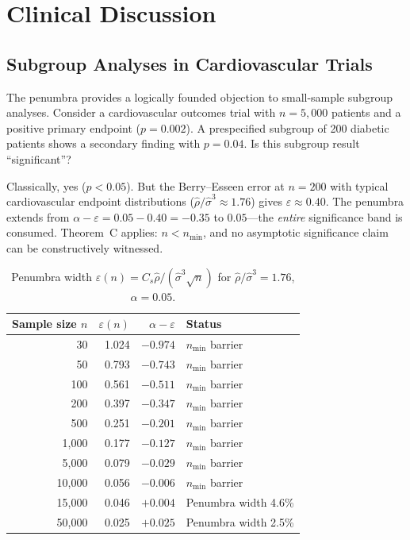 \documentclass[11pt,a4paper]{article}
\theoremstyle{plain}
\theoremstyle{definition}
\begin{document}
\section{Clinical Discussion}\label{sec:clinical}

\subsection{Subgroup Analyses in Cardiovascular Trials}

The penumbra provides a logically founded objection to small-sample subgroup analyses.  Consider a cardiovascular outcomes trial with $n = 5{,}000$ patients and a positive primary endpoint ($p = 0.002$).  A prespecified subgroup of 200 diabetic patients shows a secondary finding with $p = 0.04$.  Is this subgroup result ``significant''?

Classically, yes ($p < 0.05$).  But the Berry--Esseen error at $n = 200$ with typical cardiovascular endpoint distributions ($\hat\rho/\hat\sigma^3 \approx 1.76$) gives $\varepsilon \approx 0.40$.  The penumbra extends from $\alpha - \varepsilon = 0.05 - 0.40 = -0.35$ to $0.05$---the \emph{entire} significance band is consumed.  Theorem~C applies: $n < n_{\min}$, and no asymptotic significance claim can be constructively witnessed.

\begin{table}[ht]
\centering
\caption{Penumbra width $\varepsilon(n) = C_s \hat\rho / (\hat\sigma^3 \sqrt{n})$ for $\hat\rho/\hat\sigma^3 = 1.76$, $\alpha = 0.05$.}
\label{tab:penumbra-width}
\begin{tabular}{@{}rrrl@{}}
\toprule
\textbf{Sample size $n$} & \textbf{$\varepsilon(n)$} & \textbf{$\alpha - \varepsilon$} & \textbf{Status} \\
\midrule
30       & 1.024  & $-0.974$ & $n_{\min}$ barrier \\
50       & 0.793  & $-0.743$ & $n_{\min}$ barrier \\
100      & 0.561  & $-0.511$ & $n_{\min}$ barrier \\
200      & 0.397  & $-0.347$ & $n_{\min}$ barrier \\
500      & 0.251  & $-0.201$ & $n_{\min}$ barrier \\
1{,}000  & 0.177  & $-0.127$ & $n_{\min}$ barrier \\
5{,}000  & 0.079  & $-0.029$ & $n_{\min}$ barrier \\
10{,}000 & 0.056  & $-0.006$ & $n_{\min}$ barrier \\
15{,}000 & 0.046  & $+0.004$ & Penumbra width 4.6\% \\
50{,}000 & 0.025  & $+0.025$ & Penumbra width 2.5\% \\
\bottomrule
\end{tabular}
\end{table}
\end{document}
